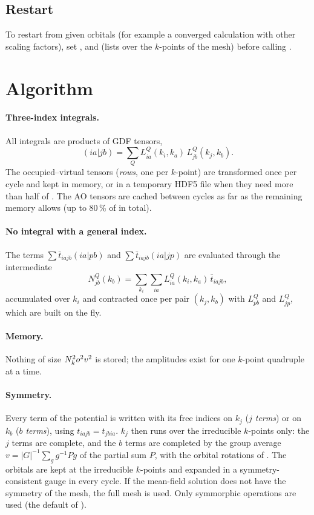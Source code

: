 \subsection{Restart}

To restart from given orbitals (for example a converged calculation with other
scaling factors), set ,  and
 (lists over the $k$-points of the mesh) before calling
.

\section{Algorithm}
\label{sec:kpt-algorithm}

\paragraph{Three-index integrals.} All integrals are products of GDF tensors,
\[
  (ia|jb) = \sum_Q L^Q_{ia}(k_i,k_a)\,L^Q_{jb}(k_j,k_b).
\]
The
occupied--virtual tensors (\emph{rows}, one per $k$-point) are transformed
once per cycle and kept in memory, or in a temporary HDF5 file when they need
more than half of . The AO tensors are cached between cycles
as far as the remaining memory allows (up to 80\,\% of  in
total).

\paragraph{No integral with a general index.} The terms
$\sum \bar t_{iajb}(ia|pb)$ and $\sum \bar t_{iajb}(ia|jp)$ are evaluated
through the intermediate
\begin{equation}
  N^Q_{jb}(k_b) = \sum_{k_i}\sum_{ia} L^Q_{ia}(k_i,k_a)\,\bar t_{iajb},
\end{equation}
accumulated over $k_i$ and contracted once per pair $(k_j,k_b)$ with
$L^Q_{pb}$ and $L^Q_{jp}$, which are built on the fly.

\paragraph{Memory.} Nothing of size $N_k^2 o^2 v^2$ is stored; the amplitudes
exist for one $k$-point quadruple at a time.

\paragraph{Symmetry.} Every term of the potential is written with its free
indices on $k_j$ (\emph{$j$ terms}) or on $k_b$ (\emph{$b$ terms}), using
$t_{iajb}=t_{jbia}$. $k_j$ then runs over the irreducible $k$-points only:
the $j$ terms are complete, and the $b$ terms are completed by the group
average $v = |G|^{-1}\sum_g g^{-1} P g$ of the partial sum $P$, with the
orbital rotations of . The orbitals are kept at the
irreducible $k$-points and expanded in a symmetry-consistent gauge in every
cycle. If the mean-field solution does not have the symmetry of the mesh, the
full mesh is used. Only symmorphic operations are used (the default of
\pyscf{}).

